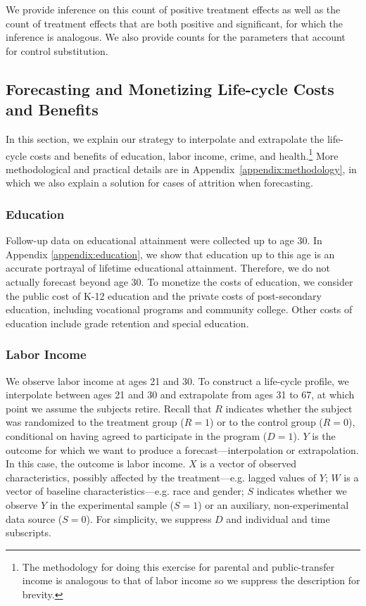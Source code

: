 We provide inference on this count of positive treatment effects as well as the count of treatment effects that are both positive and significant, for which the inference is analogous. We also provide counts for the parameters that account for control substitution. 

\subsection{Forecasting and Monetizing Life-cycle Costs and Benefits} \label{section:cbamethodology}

\noindent In this section, we explain our strategy to interpolate and extrapolate the life-cycle costs and benefits of education, labor income, crime, and health.\footnote{The methodology for doing this exercise for parental and public-transfer income is analogous to that of labor income so we suppress the description for brevity.} More methodological and practical details are in Appendix~\ref{appendix:methodology}, in which we also explain a solution for cases of attrition when forecasting. 

\subsubsection{Education}

Follow-up data on educational attainment were collected up to age 30. In Appendix \ref{appendix:education}, we show that education up to this age is an accurate portrayal of lifetime educational attainment. Therefore, we do not actually forecast beyond age 30. To monetize the costs of education, we consider the public cost of K-12 education and the private costs of post-secondary education, including vocational programs and community college. Other costs of education include grade retention and special education.

\subsubsection{Labor Income}

We observe labor income at ages 21 and 30. To construct a life-cycle profile, we interpolate between ages 21 and 30 and extrapolate from ages 31 to 67, at which point we assume the subjects retire. Recall that $R$ indicates whether the subject was randomized to the treatment group ($R=1$) or to the control group ($R=0$), conditional on having agreed to participate in the program ($D = 1$). $Y$ is the outcome for which we want to produce a forecast---interpolation or extrapolation. In this case, the outcome is labor income. $X$ is a vector of observed characteristics, possibly affected by the treatment---e.g. lagged values of $Y$; $W$ is a vector of baseline characteristics---e.g. race and gender; $S$ indicates whether we observe $Y$ in the experimental sample ($S=1$) or an auxiliary, non-experimental data source ($S=0$). For simplicity, we suppress $D$ and individual and time subscripts. \\

